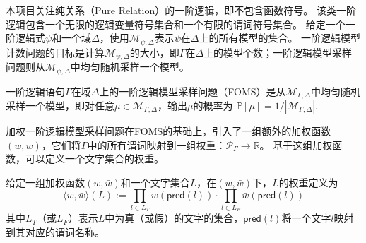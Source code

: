 \documentclass[12pt,UTF8,AutoFakeBold=3,a4paper]{ctexart} %
\newcommand{\sentence}{\Gamma}
\newcommand{\formula}{\psi}
\newcommand{\weight}{w}
\newcommand{\negweight}{\bar{w}}
\newcommand{\domain}{\Delta}
\newcommand{\real}{\mathbb{R}}
\newcommand{\pro}{\mathbb{P}}
\newcommand{\fomodels}[2]{\mathcal{M}_{#1, #2}}
\newcommand{\structure}{\mathcal{A}}
\newcommand{\typeweight}[1]{\langle \weight, \negweight\rangle(#1)}
\begin{document}
本项目关注纯关系（Pure Relation）的一阶逻辑，即不包含函数符号。
该类一阶逻辑包含一个无限的逻辑变量符号集合和一个有限的谓词符号集合。
给定一个一阶逻辑式$\formula$和一个域$\domain$，使用$\fomodels{\formula}{\domain}$表示$\formula$在$\domain$上的所有模型的集合。
一阶逻辑模型计数问题的目标是计算$\fomodels{\formula}{\domain}$的大小，即$\sentence$在$\domain$上的模型个数；一阶逻辑模型采样问题则从$\fomodels{\formula}{\domain}$中均匀随机采样一个模型。

\begin{definition}
	一阶逻辑语句$\sentence$在域$\domain$上的一阶逻辑模型采样问题（FOMS）是从$\fomodels{\sentence}{\domain}$中均匀随机采样一个模型，即对任意$\mu\in\fomodels{\sentence}{\domain}$，输出$\mu$的概率为 $\pro[\mu]=1/|\fomodels{\sentence}{\domain}|$.
\end{definition}
加权一阶逻辑模型采样问题在FOMS的基础上，引入了一组额外的加权函数$(\weight, \negweight)$，它们将$\sentence$中的所有谓词映射到一组权重：$\mathcal{P}_\sentence \to \real$。
基于这组加权函数，可以定义一个文字集合的权重。
\begin{definition}[文字集合的权重]
	\label{def:weight-of-literals}
	给定一组加权函数$(\weight, \negweight)$和一个文字集合$L$，在$(\weight, \negweight)$下，$L$的权重定义为
	\begin{equation}
		\typeweight{L} := \prod_{l\in L_T}\weight(\mathsf{pred}(l)) \cdot \prod_{l\in L_F}\negweight(\mathsf{pred}(l))
	\end{equation}
其中$L_T$（或$L_F$）表示$L$中为真（或假）的文字的集合，$\mathsf{pred}(l)$将一个文字$l$映射到其对应的谓词名称。
\end{definition}
\end{document}
